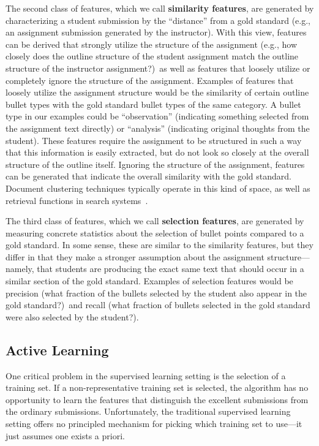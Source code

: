 The second class of features, which we call \textbf{similarity features},
are generated by characterizing a student submission by the ``distance''
from a gold standard (e.g., an assignment submission generated by the
instructor). With this view, features can be derived that strongly utilize
the structure of the assignment (e.g., how closely does the outline
structure of the student assignment match the outline structure of the
instructor assignment?)\ as well as features that loosely utilize or
completely ignore the structure of the assignment. Examples of features
that loosely utilize the assignment structure would be the similarity of
certain outline bullet types with the gold standard bullet types of the
same category. A bullet type in our examples could be ``observation''
(indicating something selected from the assignment text directly) or
``analysis'' (indicating original thoughts from the student). These
features require the assignment to be structured in such a way that this
information is easily extracted, but do not look so closely at the overall
structure of the outline itself. Ignoring the structure of the assignment,
features can be generated that indicate the overall similarity with the
gold standard. Document clustering techniques typically operate in this
kind of space, as well as retrieval functions in search
systems~\cite{Robertson:1994:SIGIR, Robertson:1996:TREC-3}.

The third class of features, which we call \textbf{selection features},
are generated by measuring concrete statistics about the selection of
bullet points compared to a gold standard. In some sense, these are similar
to the similarity features, but they differ in that they make a stronger
assumption about the assignment structure---namely, that students are
producing the exact same text that should occur in a similar section of the
gold standard. Examples of selection features would be precision (what
fraction of the bullets selected by the student also appear in the gold
standard?)\ and recall (what fraction of bullets selected in the gold
standard were also selected by the student?).

\subsection{Active Learning}
One critical problem in the supervised learning setting is the selection
of a training set. If a non-representative training set is selected, the
algorithm has no opportunity to learn the features that distinguish the
excellent submissions from the ordinary submissions. Unfortunately, the
traditional supervised learning setting offers no principled mechanism for
picking which training set to use---it just assumes one exists a priori.

